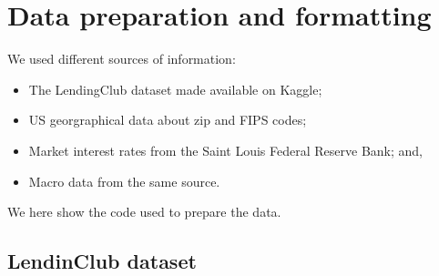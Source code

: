 \documentclass[11pt,]{report}
\begin{document}
\hypertarget{data-preparation-and-formatting}{%
\section{Data preparation and formatting}\label{data-preparation-and-formatting}}

We used different sources of information:

\begin{itemize}
\item
  The LendingClub dataset made available on Kaggle;
\item
  US georgraphical data about zip and FIPS codes;
\item
  Market interest rates from the Saint Louis Federal Reserve Bank; and,
\item
  Macro data from the same source.
\end{itemize}

We here show the code used to prepare the data.

\hypertarget{lendinclub-dataset}{%
\subsection{LendinClub dataset}\label{lendinclub-dataset}}
\end{document}

